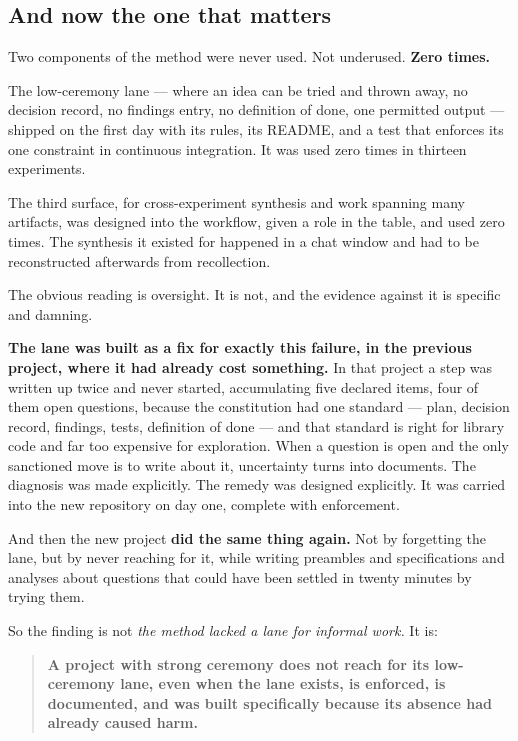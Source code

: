 \subsection{And now the one that matters}

Two components of the method were never used. Not underused. \textbf{Zero times.}

The low-ceremony lane --- where an idea can be tried and thrown away, no decision record, no findings entry, no definition of done, one permitted output --- shipped on the first day with its rules, its README, and a test that enforces its one constraint in continuous integration. It was used zero times in thirteen experiments.

The third surface, for cross-experiment synthesis and work spanning many artifacts, was designed into the workflow, given a role in the table, and used zero times. The synthesis it existed for happened in a chat window and had to be reconstructed afterwards from recollection.

The obvious reading is oversight. It is not, and the evidence against it is specific and damning.

\textbf{The lane was built as a fix for exactly this failure, in the previous project, where it had already cost something.} In that project a step was written up twice and never started, accumulating five declared items, four of them open questions, because the constitution had one standard --- plan, decision record, findings, tests, definition of done --- and that standard is right for library code and far too expensive for exploration. When a question is open and the only sanctioned move is to write about it, uncertainty turns into documents. The diagnosis was made explicitly. The remedy was designed explicitly. It was carried into the new repository on day one, complete with enforcement.

And then the new project \textbf{did the same thing again.} Not by forgetting the lane, but by never reaching for it, while writing preambles and specifications and analyses about questions that could have been settled in twenty minutes by trying them.

So the finding is not \textit{the method lacked a lane for informal work.} It is:

\begin{quote}
\textbf{A project with strong ceremony does not reach for its low-ceremony lane, even when the lane exists, is enforced, is documented, and was built specifically because its absence had already caused harm.}
\end{quote}

